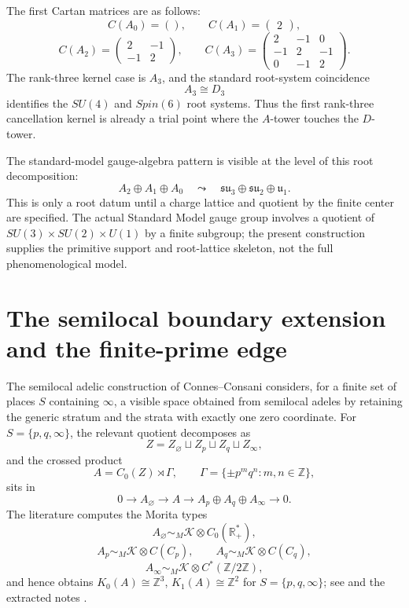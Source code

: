 \documentclass[11pt]{article}
\theoremstyle{remark}
\newcommand{\ZZ}{\mathbb Z}
\newcommand{\RR}{\mathbb R}
\newcommand{\KK}{\mathcal K}
\begin{document}
The first Cartan matrices are as follows:
\[
C(A_0)=(),
\qquad
C(A_1)=\begin{pmatrix}2\end{pmatrix},
\]
\[
C(A_2)=\begin{pmatrix}2&-1\\-1&2\end{pmatrix},
\qquad
C(A_3)=\begin{pmatrix}2&-1&0\\-1&2&-1\\0&-1&2\end{pmatrix}.
\]
The rank-three kernel case is $A_3$, and the standard root-system coincidence
\[
        A_3\cong D_3
\]
identifies the $SU(4)$ and $Spin(6)$ root systems.  Thus the first rank-three cancellation kernel is already a trial point where the $A$-tower touches the $D$-tower.

The standard-model gauge-algebra pattern is visible at the level of this root decomposition:
\[
        A_2\oplus A_1\oplus A_0
        \quad\leadsto\quad
        \mathfrak{su}_3\oplus\mathfrak{su}_2\oplus\mathfrak u_1.
\]
This is only a root datum until a charge lattice and quotient by the finite center are specified.  The actual Standard Model gauge group involves a quotient of $SU(3)\times SU(2)\times U(1)$ by a finite subgroup; the present construction supplies the primitive support and root-lattice skeleton, not the full phenomenological model.

\section{The semilocal boundary extension and the finite-prime edge}

The semilocal adelic construction of Connes--Consani considers, for a finite set of places $S$ containing $\infty$, a visible space obtained from semilocal adeles by retaining the generic stratum and the strata with exactly one zero coordinate.  For $S=\{p,q,\infty\}$, the relevant quotient decomposes as
\[
        Z=Z_\varnothing\sqcup Z_p\sqcup Z_q\sqcup Z_\infty,
\]
and the crossed product
\[
        A=C_0(Z)\rtimes\Gamma,
        \qquad
        \Gamma=\{\pm p^mq^n:m,n\in\ZZ\},
\]
sits in
\[
        0\to A_\varnothing\to A\to A_p\oplus A_q\oplus A_\infty\to0.
\]
The literature computes the Morita types
\[
        A_\varnothing\sim_M \KK\otimes C_0(\RR_+^*),
\]
\[
        A_p\sim_M\KK\otimes C(C_p),
        \qquad
        A_q\sim_M\KK\otimes C(C_q),
\]
\[
        A_\infty\sim_M\KK\otimes C^*(\ZZ/2\ZZ),
\]
and hence obtains $K_0(A)\cong\ZZ^3$, $K_1(A)\cong\ZZ^2$ for $S=\{p,q,\infty\}$; see \cite{ConnesConsaniKnots} and the extracted notes \cite{SplitZeroNotes}.
\end{document}
